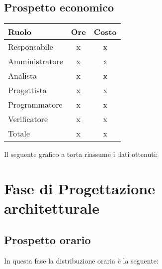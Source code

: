 {{{\subsection{Prospetto economico}\label{5.2.2}
\quad
\def\tabularxcolumn#1{m{#1}}
{	
	\begin{center}
		\renewcommand{\arraystretch}{1.4}
		\begin{tabularx}{7cm}{|X|c|c|}
			\hline
			\rowcolor{airforceblue}
			\textbf{Ruolo} & \textbf{Ore} & \textbf{Costo}\\
			\hline
			Responsabile & x & x\\
			\hline
			Amministratore & x & x\\
			\hline
			Analista & x & x\\
			\hline
			Progettista & x & x\\
			\hline
			Programmatore & x & x\\
			\hline
			Verificatore & x & x\\
			\hline
			Totale & x & x\\
			\hline
		\end{tabularx}
	\end{center}

Il seguente grafico a torta riassume i dati ottenuti:

\section{Fase di Progettazione architetturale}\label{5.3}

\subsection{Prospetto orario}\label{5.3.1}
In questa fase la distribuzione oraria è la seguente:
\quad
\def\tabularxcolumn#1{m{#1}}
{
	
}}}}}

